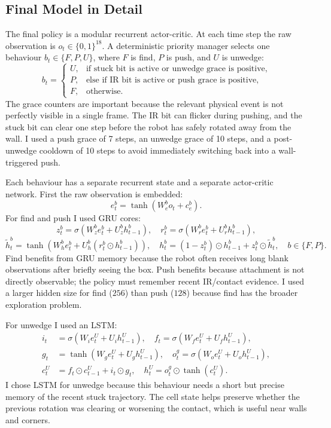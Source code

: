 \documentclass[11pt, oneside]{article}
\begin{document}
\subsection*{Final Model in Detail}
The final policy is a modular recurrent actor-critic. At each time step the raw observation is \(o_t\in\{0,1\}^{18}\). A deterministic priority manager selects one behaviour \(b_t\in\{F,P,U\}\), where \(F\) is find, \(P\) is push, and \(U\) is unwedge:
\[
b_t=
\begin{cases}
U, & \text{if stuck bit is active or unwedge grace is positive},\\
P, & \text{else if IR bit is active or push grace is positive},\\
F, & \text{otherwise}.
\end{cases}
\]
The grace counters are important because the relevant physical event is not perfectly visible in a single frame. The IR bit can flicker during pushing, and the stuck bit can clear one step before the robot has safely rotated away from the wall. I used a push grace of 7 steps, an unwedge grace of 10 steps, and a post-unwedge cooldown of 10 steps to avoid immediately switching back into a wall-triggered push.

Each behaviour has a separate recurrent state and a separate actor-critic network. First the raw observation is embedded:
\[
e_t^b=\tanh(W_e^b o_t + c_e^b).
\]
For find and push I used GRU cores:
\[
z_t^b=\sigma(W_z^b e_t^b+U_z^b h_{t-1}^b),\quad
r_t^b=\sigma(W_r^b e_t^b+U_r^b h_{t-1}^b),
\]
\[
\tilde{h}_t^b=\tanh(W_h^b e_t^b+U_h^b(r_t^b\odot h_{t-1}^b)),\quad
h_t^b=(1-z_t^b)\odot h_{t-1}^b+z_t^b\odot \tilde{h}_t^b,
\quad b\in\{F,P\}.
\]
Find benefits from GRU memory because the robot often receives long blank observations after briefly seeing the box. Push benefits because attachment is not directly observable; the policy must remember recent IR/contact evidence. I used a larger hidden size for find (\(256\)) than push (\(128\)) because find has the broader exploration problem.

For unwedge I used an LSTM:
\[
\begin{aligned}
i_t &= \sigma(W_i e_t^U+U_i h_{t-1}^U),\quad
f_t = \sigma(W_f e_t^U+U_f h_{t-1}^U),\\
g_t &= \tanh(W_g e_t^U+U_g h_{t-1}^U),\quad
o_t^g = \sigma(W_o e_t^U+U_o h_{t-1}^U),\\
c_t^U &= f_t\odot c_{t-1}^U+i_t\odot g_t,\quad
h_t^U=o_t^g\odot\tanh(c_t^U).
\end{aligned}
\]
I chose LSTM for unwedge because this behaviour needs a short but precise memory of the recent stuck trajectory. The cell state helps preserve whether the previous rotation was clearing or worsening the contact, which is useful near walls and corners.
\end{document}
